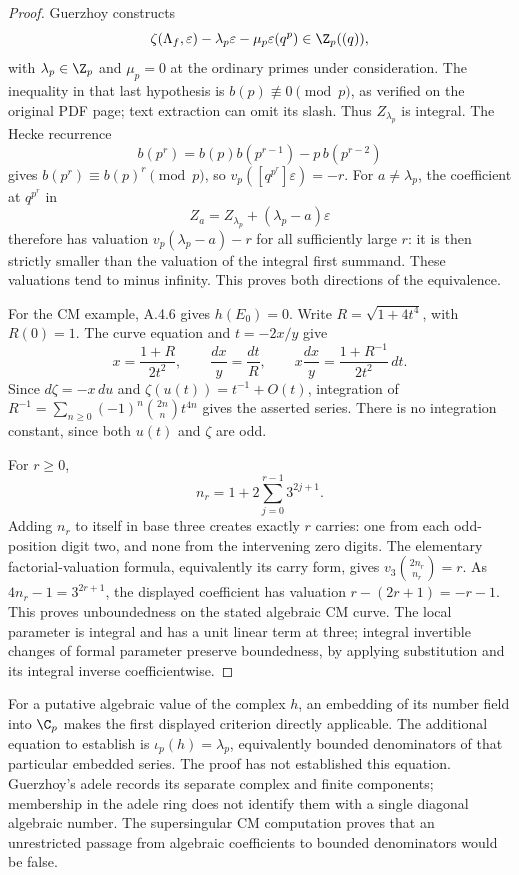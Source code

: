 \begin{proof}
Guerzhoy \cite[Theorem 2, pp.4--5, equation (4)]{EllGuerzhoy2014} constructs
\[
 \zeta(\Lambda_f,\varepsilon)-\lambda_p\varepsilon
 -\mu_p\varepsilon(q^p)\in\Z_p((q)),
\]
with $\lambda_p\in\Z_p$ and $\mu_p=0$ at the ordinary primes under consideration. The inequality in that last hypothesis is $b(p)\not\equiv0\pmod p$, as verified on the original PDF page; text extraction can omit its slash. Thus $Z_{\lambda_p}$ is integral. The Hecke recurrence
\[
 b(p^r)=b(p)b(p^{r-1})-p\,b(p^{r-2})
\]
gives $b(p^r)\equiv b(p)^r\pmod p$, so
$v_p([q^{p^r}]\varepsilon)=-r$. For $a\ne\lambda_p$, the coefficient at $q^{p^r}$ in
\[
 Z_a=Z_{\lambda_p}+(\lambda_p-a)\varepsilon
\]
therefore has valuation $v_p(\lambda_p-a)-r$ for all sufficiently large $r$: it is then strictly smaller than the valuation of the integral first summand. These valuations tend to minus infinity. This proves both directions of the equivalence.

For the CM example, A.4.6 gives $h(E_0)=0$. Write $R=\sqrt{1+4t^4}$, with $R(0)=1$. The curve equation and $t=-2x/y$ give
\[
 x=\frac{1+R}{2t^2},\qquad
 \frac{dx}{y}=\frac{dt}{R},\qquad
 x\frac{dx}{y}=\frac{1+R^{-1}}{2t^2}\,dt.
\]
Since $d\zeta=-x\,du$ and $\zeta(u(t))=t^{-1}+O(t)$, integration of
$R^{-1}=\sum_{n\ge0}(-1)^n\binom{2n}{n}t^{4n}$ gives the asserted series. There is no integration constant, since both $u(t)$ and $\zeta$ are odd.

For $r\ge0$,
\[
 n_r=1+2\sum_{j=0}^{r-1}3^{2j+1}.
\]
Adding $n_r$ to itself in base three creates exactly $r$ carries: one from each odd-position digit two, and none from the intervening zero digits. The elementary factorial-valuation formula, equivalently its carry form, gives
$v_3\binom{2n_r}{n_r}=r$. As $4n_r-1=3^{2r+1}$, the displayed coefficient has valuation
$r-(2r+1)=-r-1$. This proves unboundedness on the stated algebraic CM curve. The local parameter is integral and has a unit linear term at three; integral invertible changes of formal parameter preserve boundedness, by applying substitution and its integral inverse coefficientwise.
\end{proof}

For a putative algebraic value of the complex $h$, an embedding of its number field into $\C_p$ makes the first displayed criterion directly applicable. The additional equation to establish is $\iota_p(h)=\lambda_p$, equivalently bounded denominators of that particular embedded series. The proof has not established this equation. Guerzhoy's adele records its separate complex and finite components; membership in the adele ring does not identify them with a single diagonal algebraic number. The supersingular CM computation proves that an unrestricted passage from algebraic coefficients to bounded denominators would be false.

